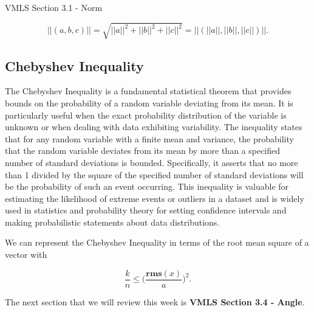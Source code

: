 \begin{notes}{VMLS Section 3.1 - Norm}
\begin{highlight}
        \begin{equation*}
            ||(a,b,c)|| = \sqrt{||a||^{2} + ||b||^{2} + ||c||^{2}} = ||(||a||,||b||,||c||)||.
        \end{equation*}
    \end{highlight}


    \subsection*{Chebyshev Inequality}

    The Chebyshev Inequality is a fundamental statistical theorem that provides bounds on the probability of a random variable deviating from its mean. It is particularly useful when the exact probability distribution 
    of the variable is unknown or when dealing with data exhibiting variability. The inequality states that for any random variable with a finite mean and variance, the probability that the random variable deviates from 
    its mean by more than a specified number of standard deviations is bounded. Specifically, it asserts that no more than 1 divided by the square of the specified number of standard deviations will be the probability 
    of such an event occurring. This inequality is valuable for estimating the likelihood of extreme events or outliers in a dataset and is widely used in statistics and probability theory for setting confidence intervals 
    and making probabilistic statements about data distributions.

    \begin{highlight}
        We can represent the Chebyshev Inequality in terms of the root mean square of a vector with

        \begin{equation*}
            \frac{k}{n} \leq \Bigg(\frac{\mathbf{rms}(x)}{a}\Bigg)^{2}.
        \end{equation*}
    \end{highlight}
\end{notes}

The next section that we will review this week is \textbf{VMLS Section 3.4 - Angle}.

